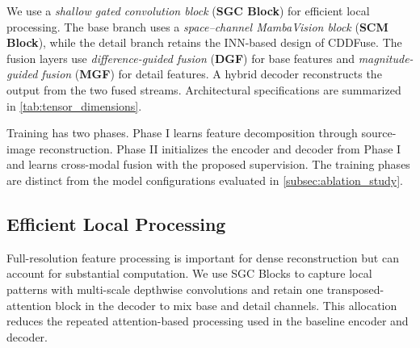 We use a \emph{shallow gated convolution block} (\textbf{SGC Block}) for efficient local processing. The base branch uses a \emph{space--channel MambaVision block} (\textbf{SCM Block}), while the detail branch retains the INN-based design of CDDFuse. The fusion layers use \emph{difference-guided fusion} (\textbf{DGF}) for base features and \emph{magnitude-guided fusion} (\textbf{MGF}) for detail features. A hybrid decoder reconstructs the output from the two fused streams. Architectural specifications are summarized in \cref{tab:tensor_dimensions}.

Training has two phases. Phase I learns feature decomposition through source-image reconstruction. Phase II initializes the encoder and decoder from Phase I and learns cross-modal fusion with the proposed supervision. The training phases are distinct from the model configurations evaluated in \cref{subsec:ablation_study}.




\subsection{Efficient Local Processing}
\label{subsec:shallow_encoder}
Full-resolution feature processing is important for dense reconstruction but can account for substantial computation. We use SGC Blocks to capture local patterns with multi-scale depthwise convolutions and retain one transposed-attention block in the decoder to mix base and detail channels. This allocation reduces the repeated attention-based processing used in the baseline encoder and decoder.

